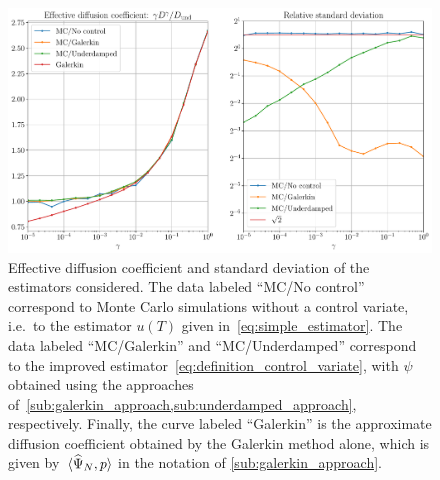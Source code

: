 \documentclass[11pt,a4paper]{article}
\theoremstyle{plain}
\numberwithin{equation}{section}
\begin{document}
\begin{figure}[ht]
    \centering
    \includegraphics[width=0.99\linewidth]{figures/underdamped_1d.pdf}
    \caption{
        Effective diffusion coefficient and standard deviation of the estimators considered.
        The data labeled ``MC/No control'' correspond to Monte Carlo simulations without a control variate,
        i.e.\ to the estimator $u(T)$ given in~\eqref{eq:simple_estimator}.
        The data labeled ``MC/Galerkin'' and ``MC/Underdamped'' correspond to the improved estimator~\eqref{eq:definition_control_variate},
        with $\psi$ obtained using the approaches of~\cref{sub:galerkin_approach,sub:underdamped_approach},
        respectively.
        Finally, the curve labeled ``Galerkin'' is the approximate diffusion coefficient obtained by the Galerkin method alone,
        which is given by~$\ip*{\widehat \Psi_N}{p}$ in the notation of \cref{sub:galerkin_approach}.
    }%
    \label{fig:effective_diffusion_langevin}
\end{figure}
\end{document}
